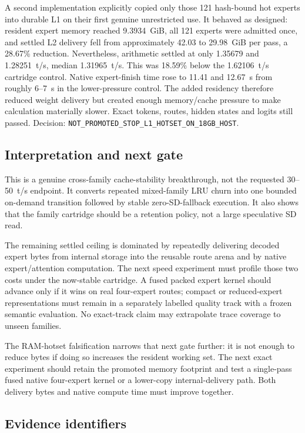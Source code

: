 A second implementation explicitly copied only those 121 hash-bound hot
experts into durable L1 on their first genuine unrestricted use.  It behaved
as designed: resident expert memory reached 9.3934~GiB, all 121 experts were
admitted once, and settled L2 delivery fell from approximately 42.03 to
29.98~GiB per pass, a 28.67\% reduction.  Nevertheless, arithmetic settled at
only 1.35679 and 1.28251~t/s, median 1.31965~t/s.  This was 18.59\% below the
1.62106~t/s cartridge control.  Native expert-finish time rose to 11.41 and
12.67~s from roughly 6--7~s in the lower-pressure control.  The added residency
therefore reduced weight delivery but created enough memory/cache pressure to
make calculation materially slower.  Exact tokens, routes, hidden states and
logits still passed.  Decision:
\texttt{NOT\_PROMOTED\_STOP\_L1\_HOTSET\_ON\_18GB\_HOST}.

\subsection{Interpretation and next gate}

This is a genuine cross-family cache-stability breakthrough, not the requested
30--50~t/s endpoint.  It converts repeated mixed-family LRU churn into one
bounded on-demand transition followed by stable zero-SD-fallback execution.
It also shows that the family cartridge should be a retention policy, not a
large speculative SD read.

The remaining settled ceiling is dominated by repeatedly delivering decoded
expert bytes from internal storage into the reusable route arena and by native
expert/attention computation.  The next speed experiment must profile those
two costs under the now-stable cartridge.  A fused packed expert kernel should
advance only if it wins on real four-expert routes; compact or reduced-expert
representations must remain in a separately labelled quality track with a
frozen semantic evaluation.  No exact-track claim may extrapolate trace
coverage to unseen families.

The RAM-hotset falsification narrows that next gate further: it is not enough
to reduce bytes if doing so increases the resident working set.  The next
exact experiment should retain the promoted memory footprint and test a
single-pass fused native four-expert kernel or a lower-copy internal-delivery
path.  Both delivery bytes and native compute time must improve together.

\subsection{Evidence identifiers}

